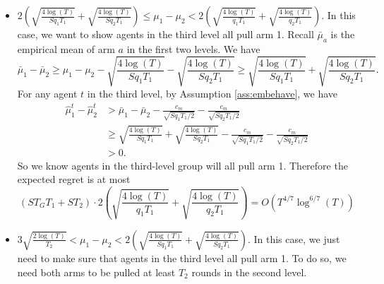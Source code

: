 {\begin{itemize}
Now consider the agents in the third level group. Recall $\bar{\mu}_a$ is the empirical mean of arm $a$ in the history they see. We have
\[
\bar{\mu}_1 - \bar{\mu}_2 \geq \mu_1 -\mu_2 - \sqrt{\frac{4\log(T)}{Sq_1T_1}} - \sqrt{\frac{4\log(T)}{Sq_2T_1}} \geq  \sqrt{\frac{4\log(T)}{q_1T_1}} 
+ \sqrt{\frac{4\log(T)}{q_2T_1}}.
\]
Similarly as above, by Assumption \ref{ass:embehave}, we know $\hat{\mu}_1^t - \hat{\mu}_2^t > 0$ for any agent $t$ in the third level. So we know agents in the third-level group will all pull arm 1. Therefore the expected regret is at most $S T_G T_1 = O(T^{4/7} \log^{6/7}(T))$. 


\item $2\left(\sqrt{\frac{4\log(T)}{Sq_1T_1}} 
+ \sqrt{\frac{4\log(T)}{Sq_2T_1}}\right) \leq \mu_1-\mu_2 < 2\left(\sqrt{\frac{4\log(T)}{q_1T_1}} 
+ \sqrt{\frac{4\log(T)}{q_2T_1}}\right)$. In this case, we want to show agents in the third level all pull arm 1. Recall $\bar{\mu}_a$ is the empirical mean of arm $a$ in the first two levels. We have
\[
\bar{\mu}_1 - \bar{\mu}_2 \geq \mu_1 -\mu_2 - \sqrt{\frac{4\log(T)}{Sq_1T_1}} - \sqrt{\frac{4\log(T)}{Sq_2T_1}} \geq  \sqrt{\frac{4\log(T)}{Sq_1T_1}} 
+ \sqrt{\frac{4\log(T)}{Sq_2T_1}}.
\]
For any agent $t$ in the third level, by Assumption \ref{ass:embehave}, we have
\begin{align*}
\hat{\mu}_1^t - \hat{\mu}_2^t &>\bar{\mu}_1 - \bar{\mu}_2 - \frac{c_m}{\sqrt{Sq_1T_1/2}} - \frac{c_m}{\sqrt{Sq_2T_1/2}}\\
&\geq  \sqrt{\frac{4\log(T)}{Sq_1T_1}} + \sqrt{\frac{4\log(T)}{Sq_2T_1}}- \frac{c_m}{\sqrt{Sq_1T_1/2}} - \frac{c_m}{\sqrt{Sq_2T_1/2}}\\
 &> 0.
\end{align*}
So we know agents in the third-level group will all pull arm 1. Therefore the expected regret is at most 
\[
(S T_G T_1 + S T_2) \cdot 2\left(\sqrt{\frac{4\log(T)}{q_1T_1}} 
+ \sqrt{\frac{4\log(T)}{q_2T_1}}\right) = O(T^{4/7} \log^{6/7}(T))
\]

\item $ 3\sqrt{\frac{2\log(T)}{T_2}} < \mu_1-\mu_2 < 2\left(\sqrt{\frac{4\log(T)}{Sq_1T_1}} 
+ \sqrt{\frac{4\log(T)}{Sq_2T_1}}\right)$. In this case, we just need to make sure that agents in the third level all pull arm 1. To do so, we need both arms to be pulled at least $T_2$ rounds in the second level.  


\end{itemize}}
